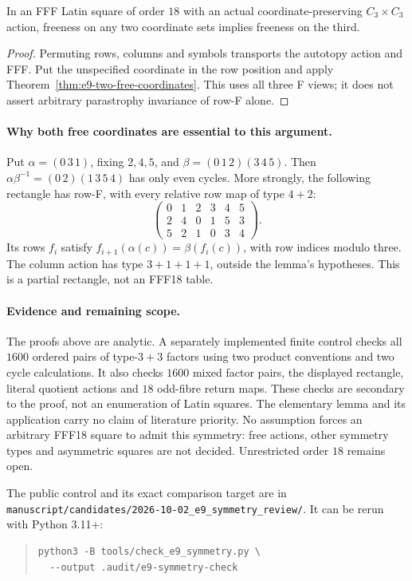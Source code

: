 \begin{corollary}\label{cor:e9-three-view-freeness}
In an FFF Latin square of order $18$ with an actual
coordinate-preserving $C_3\times C_3$ action, freeness on any two
coordinate sets implies freeness on the third.
\end{corollary}
\begin{proof}
Permuting rows, columns and symbols transports the autotopy action and
FFF. Put the unspecified coordinate in the row position and apply
Theorem~\ref{thm:e9-two-free-coordinates}. This uses all three F views;
it does not assert arbitrary parastrophy invariance of row-F alone.
\end{proof}

\paragraph{Why both free coordinates are essential to this argument.}
Put $\alpha=(0\,3\,1)$, fixing $2,4,5$, and
$\beta=(0\,1\,2)(3\,4\,5)$. Then
$\alpha\beta^{-1}=(0\,2)(1\,3\,5\,4)$ has only even cycles.
More strongly, the following rectangle has row-F, with every relative
row map of type $4+2$:
\[
\begin{pmatrix}
0&1&2&3&4&5\\
2&4&0&1&5&3\\
5&2&1&0&3&4
\end{pmatrix}.
\]
Its rows $f_i$ satisfy $f_{i+1}(\alpha(c))=\beta(f_i(c))$, with row
indices modulo three. The column action has type $3+1+1+1$, outside
the lemma's hypotheses. This is a partial rectangle, not an FFF18 table.

\paragraph{Evidence and remaining scope.}
The proofs above are analytic. A separately implemented finite control
checks all $1600$ ordered pairs of type-$3+3$ factors using two product
conventions and two cycle calculations. It also checks $1600$ mixed
factor pairs, the displayed rectangle, literal quotient actions and
$18$ odd-fibre return maps. These checks are secondary to the proof,
not an enumeration of Latin squares. The elementary lemma and its
application carry no claim of literature priority. No assumption forces
an arbitrary FFF18 square to admit this symmetry: free actions, other
symmetry types and asymmetric squares are not decided. Unrestricted
order $18$ remains open.

The public control and its exact comparison target are in
\nolinkurl{manuscript/candidates/2026-10-02_e9_symmetry_review/}.
It can be rerun with Python 3.11+:
\begin{quote}\small
\begin{verbatim}
python3 -B tools/check_e9_symmetry.py \
  --output .audit/e9-symmetry-check
\end{verbatim}
\end{quote}
